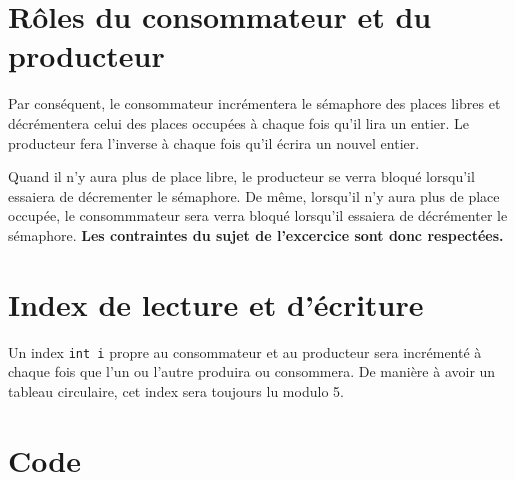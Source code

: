 \section{Rôles du consommateur et du producteur}
Par conséquent, le consommateur incrémentera le sémaphore des places libres et décrémentera celui des places occupées à chaque fois qu'il lira un entier. Le producteur fera l'inverse à chaque fois qu'il écrira un nouvel entier.

\medskip

Quand il n'y aura plus de place libre, le producteur se verra bloqué lorsqu'il essaiera de décrementer le sémaphore. De même, lorsqu'il n'y aura plus de place occupée, le consommmateur sera verra bloqué lorsqu'il essaiera de décrémenter le sémaphore. \textbf{Les contraintes du sujet de l'excercice sont donc respectées.}

\section{Index de lecture et d'écriture}

Un index \lstinline{int i} propre au consommateur et au producteur sera incrémenté à chaque fois que l'un ou l'autre produira ou consommera. De manière à avoir un tableau circulaire, cet index sera toujours \og lu\fg{} modulo 5.

\section{Code}

